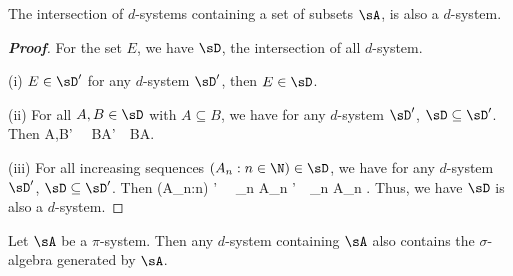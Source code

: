 \begin{proposition}\label{pro:intersection_d_system}
The intersection of $d$-systems containing a set of subsets $\sA$, is also a $d$-system.
\end{proposition}

\begin{proof}[\bf Proof]
For the set $E$, we have $\sD$, the intersection of all $d$-system.
\ben
\item[(i)] $E\in \sD'$ for any $d$-system $\sD'$, then $E\in \sD$.
\item[(ii)] For all $A,B\in \sD$ with $A\subseteq B$, we have for any $d$-system $\sD'$, $\sD\subseteq \sD'$. Then
\be
A,B\in \sD' \ \ra \ B\bs A\in \sD'\ \ra \ B\bs A\in \sD.
\ee
\item[(iii)] For all increasing sequences $(A_n:n\in\N)\in \sD$, we have for any $d$-system $\sD'$, $\sD\subseteq \sD'$. Then
\be
(A_n:n\in\N) \in \sD' \ \ra \ \bigcup_n A_n \in \sD'\ \ra \ \bigcup_n A_n \in \sD.
\ee
\een
Thus, we have $\sD$ is also a $d$-system.
\end{proof}

\begin{lemma}\label{lem:dynkin_lemma}
Let $\sA$ be a $\pi$-system. Then any $d$-system containing $\sA$ also contains the $\sigma$-algebra generated by $\sA$.
\end{lemma}

